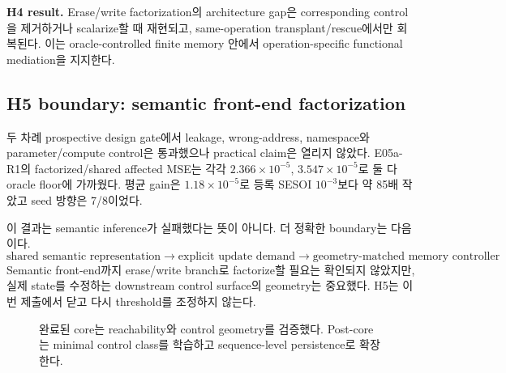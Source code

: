 \documentclass[10.3pt,a4paper]{article}
\begin{document}
\begin{resultbox}
\textbf{H4 result.} Erase/write factorization의 architecture gap은 corresponding control을 제거하거나 scalarize할 때 재현되고, same-operation transplant/rescue에서만 회복된다. 이는 oracle-controlled finite memory 안에서 operation-specific functional mediation을 지지한다.
\end{resultbox}

\subsection{H5 boundary: semantic front-end factorization}
두 차례 prospective design gate에서 leakage, wrong-address, namespace와 parameter/compute control은 통과했으나 practical claim은 열리지 않았다. E05a-R1의 factorized/shared affected MSE는 각각 $2.366\times10^{-5}$, $3.547\times10^{-5}$로 둘 다 oracle floor에 가까웠다. 평균 gain은 $1.18\times10^{-5}$로 등록 SESOI $10^{-3}$보다 약 85배 작았고 seed 방향은 7/8이었다.

이 결과는 semantic inference가 실패했다는 뜻이 아니다. 더 정확한 boundary는 다음이다.
\[
\boxed{
\text{shared semantic representation}
\rightarrow
\text{explicit update demand}
\rightarrow
\text{geometry-matched memory controller}
}
\]
Semantic front-end까지 erase/write branch로 factorize할 필요는 확인되지 않았지만, 실제 state를 수정하는 downstream control surface의 geometry는 중요했다. H5는 이번 제출에서 닫고 다시 threshold를 조정하지 않는다.

\begin{figure}[t]
\centering
{}
\caption{완료된 core는 reachability와 control geometry를 검증했다. Post-core는 minimal control class를 학습하고 sequence-level persistence로 확장한다.}
\end{figure}
\end{document}

